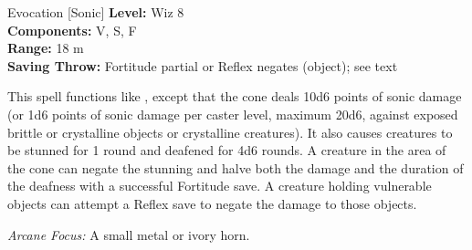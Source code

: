 {Evocation [Sonic]}
{
	\textbf{Level:}
	Wiz 8\\
	\textbf{Components:}
	V, S, F\\
	\textbf{Range:}
	18 m\\
	\textbf{Saving Throw:}
	Fortitude partial or Reflex negates (object); see text\\
}
{
	This spell functions like , except that the cone deals 10d6 points of sonic damage (or 1d6 points of sonic damage per caster level, maximum 20d6, against exposed brittle or crystalline objects or crystalline creatures). It also causes creatures to be stunned for 1 round and deafened for 4d6 rounds. A creature in the area of the cone can negate the stunning and halve both the damage and the duration of the deafness with a successful Fortitude save. A creature holding vulnerable objects can attempt a Reflex save to negate the damage to those objects.

	\textit{Arcane Focus:}
	A small metal or ivory horn.

}
